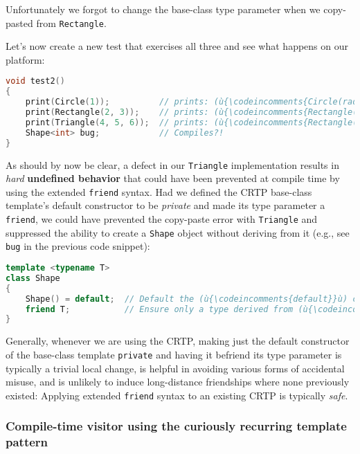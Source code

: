 \noindent Unfortunately we forgot to change the base-class type parameter when we
copy-pasted from \texttt{Rectangle}.

Let's now create a new test that exercises all three and see what
happens on our platform:

\begin{lstlisting}[language=C++]
void test2()
{
    print(Circle(1));          // prints: (ù{\codeincomments{Circle(radius = 1)}}ù)
    print(Rectangle(2, 3));    // prints: (ù{\codeincomments{Rectangle(length = 2, width = 3)}}ù)
    print(Triangle(4, 5, 6));  // prints: (ù{\codeincomments{Rectangle(length = 4, width = 5)}}ù) ?!
    Shape<int> bug;            // Compiles?!
}
\end{lstlisting}

\noindent As should by now be clear, a defect in our \texttt{Triangle}
implementation results in \emph{hard} \textbf{undefined behavior} that
could have been prevented at compile time by using the extended
\texttt{friend} syntax. Had we defined the CRTP base-class template's
default constructor to be \emph{private} and made its type parameter a
\texttt{friend}, we could have prevented the copy-paste error with
\texttt{Triangle} and suppressed the ability to create a \texttt{Shape}
object without deriving from it (e.g., see \texttt{bug} in the previous
code snippet):

\begin{lstlisting}[language=C++]
template <typename T>
class Shape
{
    Shape() = default;  // Default the (ù{\codeincomments{default}}ù) constructor to be (ù{\codeincomments{private}}ù).
    friend T;           // Ensure only a type derived from (ù{\codeincomments{T}}ù) has access.
}
\end{lstlisting}

\noindent Generally, whenever we are using the CRTP, making just the
default constructor of the base-class template \texttt{private} and
having it befriend its type parameter is typically a trivial local
change, is helpful in avoiding various forms of accidental misuse, and
is unlikely to induce long-distance friendships where none previously
existed: Applying extended \texttt{friend} syntax to an existing CRTP
is typically \emph{safe}.

\subsubsection[Compile-time visitor using the curiously recurring template pattern]{Compile-time visitor using the curiously recurring template pattern}\label{compile-time-visitor-using-crtp}

